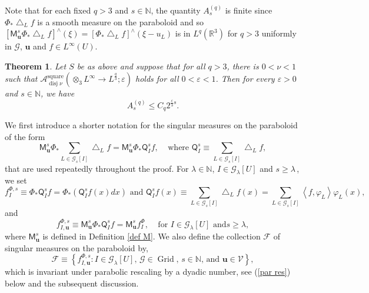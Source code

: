 \documentclass{amsart}%
\newtheorem{theorem}{Theorem}
\theoremstyle{plain}
\numberwithin{equation}{section}
\begin{document}
Note that for each fixed $q>3$ and $s\in\mathbb{N}$, the quantity
$A_{s}^{\left(  q\right)  }$ is finite since $\Phi_{\ast}\bigtriangleup_{L}f$
is a smooth measure on the paraboloid and so $\left[  \mathsf{M}_{\mathbf{u}%
}^{s}\Phi_{\ast}\bigtriangleup_{L}f\right]  ^{\wedge}\left(  \xi\right)
=\left[  \Phi_{\ast}\bigtriangleup_{L}f\right]  ^{\wedge}\left(  \xi
-u_{L}\right)  $ is in $L^{q}\left(  \mathbb{R}^{3}\right)  $ for $q>3$
uniformly in $\mathcal{G}$, $\mathbf{u}$ and $f\in L^{\infty}\left(  U\right)
$.

\begin{theorem}
\label{Loc lin}Let $S$ be as above and suppose that for all $q>3$, there is
$0<\nu<1$ such that $\mathcal{A}_{\operatorname*{disj}\nu}%
^{\operatorname*{square}}\left(  \otimes_{3}L^{\infty}\rightarrow L^{\frac
{q}{3}};\varepsilon\right)  $ holds for all $0<\varepsilon<1$. Then for every
$\varepsilon>0$ and $s\in\mathbb{N}$, we have%
\[
A_{s}^{\left(  q\right)  }\leq C_{q}2^{\frac{\varepsilon}{3}s}.
\]

\end{theorem}

We first introduce a shorter notation for the singular measures on the
paraboloid of the form
\[
\mathsf{M}_{\mathbf{u}}^{s}\Phi_{\ast}\sum_{L\in\mathcal{G}_{s}\left[
I\right]  }\bigtriangleup_{L}f=\mathsf{M}_{\mathbf{u}}^{s}\Phi_{\ast
}\mathsf{Q}_{I}^{s}f,\ \ \ \ \ \text{where }\mathsf{Q}_{I}^{s}\equiv\sum
_{L\in\mathcal{G}_{s}\left[  I\right]  }\bigtriangleup_{L}f,
\]
that are used repeatedly throughout the proof. For $\lambda\in\mathbb{N}$,
$I\in\mathcal{G}_{\lambda}\left[  U\right]  $ and $s\geq\lambda\,$, we set%
\begin{equation}
f_{I}^{\Phi,s}\equiv\Phi_{\ast}\mathsf{Q}_{I}^{s}f=\Phi_{\ast}\left(
\mathsf{Q}_{I}^{s}f\left(  x\right)  dx\right)  \text{ and }\mathsf{Q}_{I}%
^{s}f\left(  x\right)  \equiv\sum_{L\in\mathcal{G}_{s}\left[  I\right]
}\bigtriangleup_{L}f\left(  x\right)  =\sum_{L\in\mathcal{G}_{s}\left[
I\right]  }\left\langle f,\varphi_{L}\right\rangle \varphi_{L}\left(
x\right)  , \label{def delta}%
\end{equation}
and%
\begin{equation}
f_{I,\mathbf{u}}^{\Phi,s}\equiv\mathsf{M}_{\mathbf{u}}^{s}\Phi_{\ast
}\mathsf{Q}_{I}^{s}f=\mathsf{M}_{\mathbf{u}}^{s}f_{I}^{\Phi}%
,\ \ \ \ \ \text{for }I\in\mathcal{G}_{\lambda}\left[  U\right]  \text{ and
}s\geq\lambda, \label{def f I u}%
\end{equation}
where $\mathsf{M}_{\mathbf{u}}^{s}$ is defined in Definition \ref{def M}. We
also define the collection $\mathcal{F}$ of singular measures on the
paraboloid by,
\[
\mathcal{F}\equiv\left\{  f_{I,\mathbf{u}}^{\Phi,s}:I\in\mathcal{G}_{\lambda
}\left[  U\right]  \text{, }\mathcal{G}\in\operatorname*{Grid}\text{, }%
s\in\mathbb{N}\text{, and }\mathbf{u}\in\mathcal{V}\right\}  ,
\]
which is invariant under parabolic rescaling by a dyadic number, see
(\ref{par res}) below and the subsequent discussion.
\end{document}

